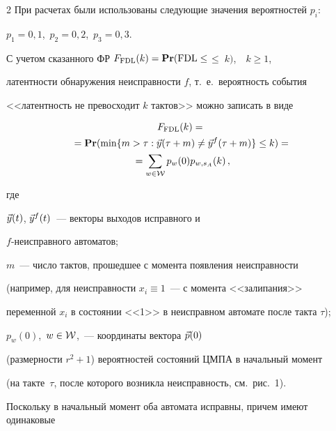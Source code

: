 \begin{multicols}{2}
При расчетах были использованы следующие значения вероятностей $p_i$:


$p_1 = 0{,}1$,\ $p_2 = 0{,}2$,\ $p_3 = 0{,}3$.










\medskip


 С учетом сказанного ФР $F_{\mathrm{FDL}}(k)={\bf Pr}(\mathrm{FDL}\le$\linebreak $\le\; k)$,\ \ $k \ge 1$,


латентности обнаружения не\-ис\-прав\-ности $f$, т.\ е.\ вероятность события


<<латентность не превосходит $k$ тактов>> можно записать в виде


\begin{multline}


F_{\mathrm{FDL}}(k)


={}\\


{}=


{\bf Pr}(\min\{m > \tau: \v y(\tau + m) \ne \v y^f(\tau + m)\} \le


 k)={}\\


 {}=


\sum_{w\in {\cal W}} p_w(0) p_{w,s_A}(k)\,,


\label{3}


\end{multline}


где


$\vec y(t)$, $\vec y^f(t)$~--- векторы выходов исправного и


$f$-неисправного автоматов;


$m$~--- число тактов, прошедшее с момента появления неисправности


(например, для неисправности $x_i \equiv 1$~--- с момента <<залипания>>


переменной $x_i$ в состоянии <<1>> в неисправном автомате после такта $\tau$);


$p_w(0)$,\ $w\in{\cal W}$,~--- координаты вектора $\vec p(0)$


(размерности $r^2 + 1$) вероятностей состояний ЦМПА в начальный момент


(на такте~$\tau$, после которого возникла неисправность, см.\ рис.~1).


Поскольку в начальный момент оба автомата исправны, причем имеют одинаковые



\end{multicols}
